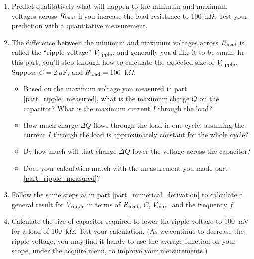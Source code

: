\begin{enumerate}[wide]
\item Predict qualitatively what will happen to the minimum and maximum voltages across $R_{\rm load}$ if you increase the load resistance to 100~k$\Omega$.  Test your prediction with a quantitative measurement. \label{part_ripple_measured}

\item The difference between the minimum and maximum voltages across $R_{\rm load}$ is called the ``ripple voltage'' $V_{\rm ripple}$, and generally you'd like it to be small.  In this part, you'll step through how to calculate the expected size of $V_{\rm ripple}$.  Suppose $C = 2~\mu$F, and $R_{\rm load}= 100$~k$\Omega$. \label{part_ripple_defined}

\begin{itemize}
\item Based on the maximum voltage you measured in part \ref{part_ripple_measured}, what is the maximum charge $Q$ on the capacitor?  What is the maximum current $I$ through the load?  \label{part_numerical_derivation}

\item How much charge $\Delta Q$ flows through the load in one cycle, assuming the current $I$ through the load is approximately constant for the whole cycle?  

\item By how much will that change $\Delta Q$ lower the voltage across the capacitor?  

\item Does your calculation match with the measurement you made part \ref{part_ripple_measured}?  
\end{itemize}

\item Follow the same steps as in part \ref{part_numerical_derivation} to calculate a general result for $V_{\rm ripple}$ in terms of $R_{\rm load}$, $C$,  $V_{\rm max}$, and the frequency $f$. \label{part_symbolic_derivation}

\item Calculate the size of capacitor required to lower the ripple voltage to 100~mV for a load of 100~k$\Omega$.  Test your calculation.  (As we continue to decrease the ripple voltage, you may find it handy to use the average function on your scope, under the acquire menu, to improve your measurements.)


\end{enumerate}
